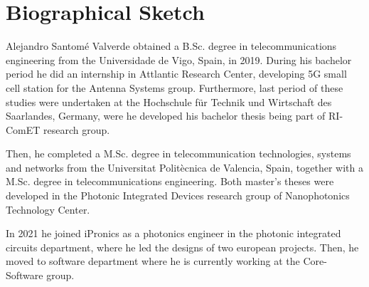 

\chapter*{Biographical Sketch}

Alejandro Santomé Valverde obtained a B.Sc. degree in telecommunications engineering from the 
Universidade de Vigo, Spain, in 2019. During his bachelor period he did an internship in Attlantic 
Research Center, developing 5G small cell station for the Antenna Systems group. Furthermore, last 
period of these studies were undertaken at the Hochschule für Technik und Wirtschaft des 
Saarlandes, Germany, were he developed his bachelor thesis being part of RI-ComET research group.

Then, he completed a M.Sc. degree in telecommunication technologies, systems and networks from the 
Universitat Politècnica de Valencia, Spain, together with a M.Sc. degree in telecommunications 
engineering. Both master's theses were developed in the Photonic Integrated Devices research group 
of Nanophotonics Technology Center.

In 2021 he joined iPronics as a photonics engineer in the photonic integrated circuits department, 
where he led the designs of two european projects. Then, he moved to software department where he 
is currently working at the Core-Software group.
